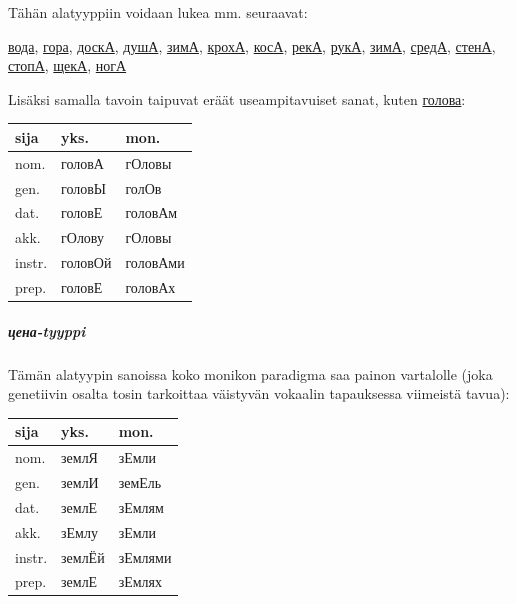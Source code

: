 \documentclass[]{scrreprt}
\begin{document}
Tähän alatyyppiin voidaan lukea mm. seuraavat:

\href{http://ru.wiktionary.org/wiki/\%D0\%B2\%D0\%BE\%D0\%B4\%D0\%B0}{вода},
\href{http://ru.wiktionary.org/wiki/\%D0\%B3\%D0\%BE\%D1\%80\%D0\%B0}{гора},
\href{http://ru.wiktionary.org/wiki/\%D0\%B4\%D0\%BE\%D1\%81\%D0\%BA\%D0\%B0}{доскА},
\href{http://ru.wiktionary.org/wiki/\%D0\%B4\%D1\%83\%D1\%88\%D0\%B0}{душА},
\href{http://ru.wiktionary.org/wiki/\%D0\%B7\%D0\%B8\%D0\%BC\%D0\%B0}{зимА},
\href{http://ru.wiktionary.org/wiki/\%D0\%BA\%D1\%80\%D0\%BE\%D1\%85\%D0\%B0}{крохА},
\href{http://ru.wiktionary.org/wiki/\%D0\%BA\%D0\%BE\%D1\%81\%D0\%B0}{косА},
\href{http://ru.wiktionary.org/wiki/\%D1\%80\%D0\%B5\%D0\%BA\%D0\%B0}{рекА},
\href{http://ru.wiktionary.org/wiki/\%D1\%80\%D1\%83\%D0\%BA\%D0\%B0}{рукА},
\href{http://ru.wiktionary.org/wiki/\%D0\%B7\%D0\%B8\%D0\%BC\%D0\%B0}{зимА},
\href{http://ru.wiktionary.org/wiki/\%D1\%81\%D1\%80\%D0\%B5\%D0\%B4\%D0\%B0}{средА},
\href{http://ru.wiktionary.org/wiki/\%D1\%81\%D1\%82\%D0\%B5\%D0\%BD\%D0\%B0}{стенА},
\href{http://ru.wiktionary.org/wiki/\%D1\%81\%D1\%82\%D0\%BE\%D0\%BF\%D0\%B0}{стопА},
\href{http://ru.wiktionary.org/wiki/\%D1\%89\%D0\%B5\%D0\%BA\%D0\%B0}{щекА},
\href{http://ru.wiktionary.org/wiki/\%D0\%BD\%D0\%BE\%D0\%B3\%D0\%B0}{ногА}

Lisäksi samalla tavoin taipuvat eräät useampitavuiset sanat, kuten
\href{http://ru.wiktionary.org/wiki/\%D0\%B3\%D0\%BE\%D0\%BB\%D0\%BE\%D0\%B2\%D0\%B0}{голова}:

\begin{longtable}[c]{@{}lll@{}}
\toprule
sija & yks. & mon.\tabularnewline
\midrule
\endhead
nom. & головА & гОловы\tabularnewline
gen. & головЫ & голОв\tabularnewline
dat. & головЕ & головАм\tabularnewline
akk. & гОлову & гОловы\tabularnewline
instr. & головОй & головАми\tabularnewline
prep. & головЕ & головАх\tabularnewline
\bottomrule
\end{longtable}

\subparagraph{цена-tyyppi}\label{ux446ux435ux43dux430-tyyppi}

Tämän alatyypin sanoissa koko monikon paradigma saa painon vartalolle
(joka genetiivin osalta tosin tarkoittaa väistyvän vokaalin tapauksessa
viimeistä tavua):

\begin{longtable}[c]{@{}lll@{}}
\toprule
sija & yks. & mon.\tabularnewline
\midrule
\endhead
nom. & землЯ & зЕмли\tabularnewline
gen. & землИ & земЕль\tabularnewline
dat. & землЕ & зЕмлям\tabularnewline
akk. & зЕмлу & зЕмли\tabularnewline
instr. & землЁй & зЕмлями\tabularnewline
prep. & землЕ & зЕмлях\tabularnewline
\bottomrule
\end{longtable}
\end{document}
